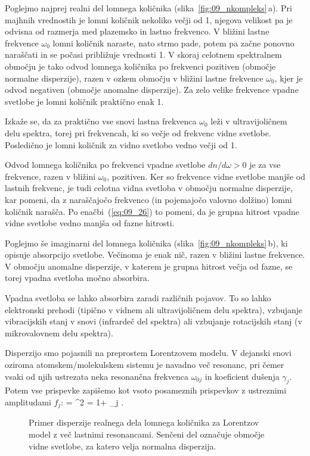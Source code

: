 Poglejmo najprej realni del lomnega količnika (slika~\ref{fig:09_nkompleks}\,a). 
Pri majhnih vrednostih je lomni količnik nekoliko večji od 1, 
njegova velikost pa je odvisna od razmerja med plazemsko in lastno frekvenco.
V bližini lastne frekvence $\omega_0$ lomni količnik naraste, nato strmo pade, potem pa 
začne ponovno naraščati in se počasi približuje vrednosti 1. V skoraj celotnem 
spektralnem območju je tako odvod lomnega količnika po frekvenci pozitiven 
(območje normalne disperzije), razen v ozkem območju v bližini lastne 
frekvence $\omega_0$, kjer je odvod negativen (območje anomalne disperzije). 
Za zelo velike frekvence vpadne svetlobe je lomni količnik praktično enak 1.

Izkaže se, da za praktično vse snovi lastna frekvenca $\omega_0$
leži v ultravijoličnem delu spektra, torej pri frekvencah, ki so večje od
frekvenc vidne svetlobe. Posledično je lomni količnik za vidno svetlobo 
vedno večji od 1.

Odvod lomnega količnika po frekvenci vpadne svetlobe $dn/d\omega >0$
je za vse frekvence, razen v bližini $\omega_0$, pozitiven. 
Ker so frekvence vidne svetlobe manjše od lastnih frekvenc, je tudi celotna
vidna svetloba v območju normalne disperzije, kar pomeni, da z naraščajočo
frekvenco (in pojemajočo valovno dolžino) lomni količnik narašča. 
Po enačbi~(\ref{eq:09_26}) to pomeni, da je grupna hitrost vpadne vidne 
svetlobe vedno manjša od fazne hitrosti. 

Poglejmo še imaginarni del lomnega količnika (slika~\ref{fig:09_nkompleks}\,b), ki 
opisuje absorpcijo svetlobe. Večinoma je enak nič, razen v bližini lastne frekvence. 
V območju anomalne disperzije, v katerem je grupna hitrost večja od fazne, se 
torej vpadna svetloba močno absorbira. 

\begin{remark}
Vpadna svetloba se lahko absorbira zaradi različnih pojavov. To so lahko 
elektronski prehodi (tipično v vidnem ali ultravijoličnem delu spektra), 
vzbujanje vibracijskih stanj v snovi (infrardeč del spektra) ali 
vzbujanje rotacijskih stanj (v mikrovalovnem delu spektra).
\end{remark}

Disperzijo smo pojasnili na preprostem Lorentzovem modelu.
V dejanski snovi oziroma atomskem/molekulskem sistemu je navadno več resonanc, pri čemer
vsaki od njih ustrezata neka resonančna frekvenca $\omega_{0j}$ in koeficient
dušenja $\gamma_j$. Potem vse prispevke zapišemo kot vsoto posameznih prispevkov 
z ustreznimi amplitudami $f_j$:
\beq
\varepsilon = ^2 = 1+ \sum_j .
\label{eq:09_27}
\eeq
\begin{figure}[h!]
\centering
\def\svgwidth{140truemm} 

\caption{Primer disperzije realnega dela lomnega količnika za Lorentzov model 
z več lastnimi resonancami. Senčeni del označuje območje vidne svetlobe, 
za katero velja normalna disperzija.}
\label{fig:09_disp_multi}
\end{figure}

